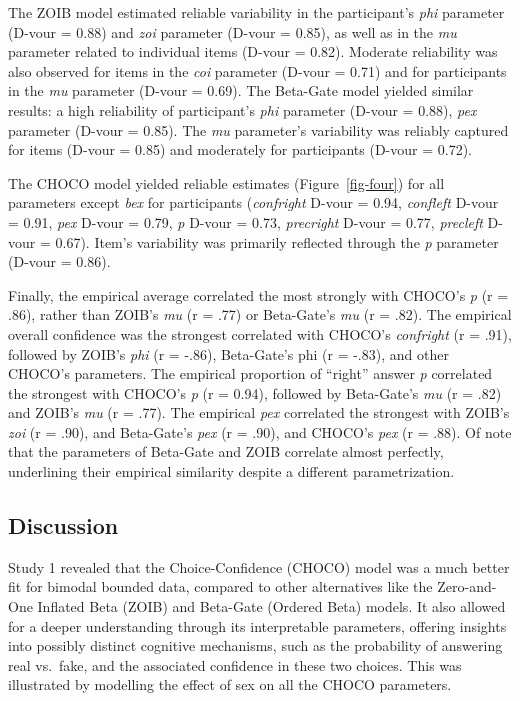 \documentclass[
  jou,
  floatsintext,
  longtable,
  nolmodern,
  notxfonts,
  notimes,
  colorlinks=true,linkcolor=blue,citecolor=blue,urlcolor=blue]{apa7}
\begin{document}
The ZOIB model estimated reliable variability in the participant's
\emph{phi} parameter (D-vour = 0.88) and \emph{zoi} parameter (D-vour =
0.85), as well as in the \emph{mu} parameter related to individual items
(D-vour = 0.82). Moderate reliability was also observed for items in the
\emph{coi} parameter (D-vour = 0.71) and for participants in the
\emph{mu} parameter (D-vour = 0.69). The Beta-Gate model yielded similar
results: a high reliability of participant's \emph{phi} parameter
(D-vour = 0.88), \emph{pex} parameter (D-vour = 0.85). The \emph{mu}
parameter's variability was reliably captured for items (D-vour = 0.85)
and moderately for participants (D-vour = 0.72).

The CHOCO model yielded reliable estimates (Figure~\ref{fig-four}) for
all parameters except \emph{bex} for participants (\emph{confright}
D-vour = 0.94, \emph{confleft} D-vour = 0.91, \emph{pex} D-vour = 0.79,
\emph{p} D-vour = 0.73, \emph{precright} D-vour = 0.77, \emph{precleft}
D-vour = 0.67). Item's variability was primarily reflected through the
\emph{p} parameter (D-vour = 0.86).

Finally, the empirical average correlated the most strongly with CHOCO's
\emph{p} (r = .86), rather than ZOIB's \emph{mu} (r = .77) or
Beta-Gate's \emph{mu} (r = .82). The empirical overall confidence was
the strongest correlated with CHOCO's \emph{confright} (r = .91),
followed by ZOIB's \emph{phi} (r = -.86), Beta-Gate's phi (r = -.83),
and other CHOCO's parameters. The empirical proportion of ``right''
answer \emph{p} correlated the strongest with CHOCO's \emph{p} (r =
0.94), followed by Beta-Gate's \emph{mu} (r = .82) and ZOIB's \emph{mu}
(r = .77). The empirical \emph{pex} correlated the strongest with ZOIB's
\emph{zoi} (r = .90), and Beta-Gate's \emph{pex} (r = .90), and CHOCO's
\emph{pex} (r = .88). Of note that the parameters of Beta-Gate and ZOIB
correlate almost perfectly, underlining their empirical similarity
despite a different parametrization.

\subsection{Discussion}\label{discussion}

Study 1 revealed that the Choice-Confidence (CHOCO) model was a much
better fit for bimodal bounded data, compared to other alternatives like
the Zero-and-One Inflated Beta (ZOIB) and Beta-Gate (Ordered Beta)
models. It also allowed for a deeper understanding through its
interpretable parameters, offering insights into possibly distinct
cognitive mechanisms, such as the probability of answering real
vs.~fake, and the associated confidence in these two choices. This was
illustrated by modelling the effect of sex on all the CHOCO parameters.
\end{document}
